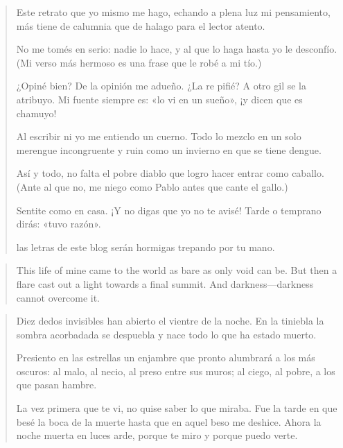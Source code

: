 \documentclass[a4paper, 12pt]{article}
\begin{document}
\pagebreak

\begin{verse}
   Este retrato que yo mismo me hago,
   echando a plena luz mi pensamiento,
   más tiene de calumnia que de halago
   para el lector atento.

   No me tomés en serio: nadie lo hace,
   y al que lo haga hasta yo le desconfío.
   (Mi verso más hermoso es una frase
   que le robé a mi tío.)

   ¿Opiné bien? De la opinión me adueño.
   ¿La re pifié? A otro gil se la atribuyo.
   Mi fuente siempre es: «lo vi en un sueño»,
   ¡y dicen que es chamuyo!

   Al escribir ni yo me entiendo un cuerno.
   Todo lo mezclo en un solo merengue
   incongruente y ruin como un invierno
   en que se tiene dengue.

   Así y todo, no falta el pobre diablo
   que logro hacer entrar como caballo.
   (Ante al que no, me niego como Pablo
   antes que cante el gallo.)

   Sentite como en casa. ¡Y no digas
   que yo no te avisé! Tarde o temprano
   dirás: «tuvo razón».


   las letras de este blog serán hormigas
   trepando por tu mano.









\end{verse}

\pagebreak 

\begin{verse}
    This life of mine came to the world as bare
    as only void can be. But then a flare
    cast out a light towards a final summit.
    And darkness—darkness cannot overcome it.
\end{verse}


\pagebreak 

\begin{verse}
    
Diez dedos invisibles han abierto
el vientre de la noche. En la tiniebla
la sombra acorbadada se despuebla
y nace todo lo que ha estado muerto.

Presiento en las estrellas un enjambre
que pronto alumbrará a los más oscuros:
al malo, al necio, al preso entre sus muros;
al ciego, al pobre, a los que pasan hambre.

La vez primera que te vi, no quise
saber lo que miraba. Fue la tarde
en que besé la boca de la muerte
hasta que en aquel beso me deshice.
Ahora la noche muerta en luces arde,
porque te miro y porque puedo verte.


\end{verse}
\end{document}
